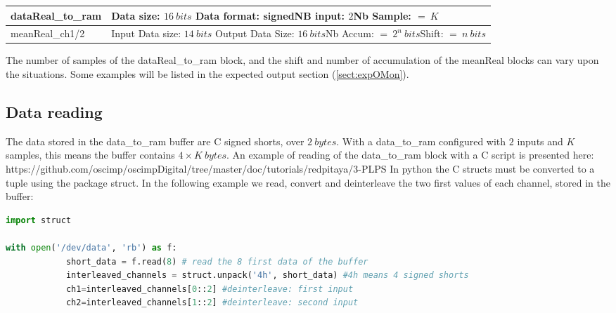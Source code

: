 \documentclass[12pt,oneside]{article}
\begin{document}
\begin{center}
	\begin{tabular}{|>{\centering\arraybackslash}m{.3\linewidth} | >{\centering\arraybackslash}m{.3\linewidth} |}
		\hline
		dataReal\_to\_ram&Data size: $16~bits$ \newline Data format: signed\newline NB input: $2$\newline Nb Sample: $=~K$\\
		\hline
		meanReal\_ch1/2&Input Data size: $14~bits$ \newline Output Data Size: $16~bits$\newline Nb Accum: $=~2^n~bits$\newline Shift: $=~n~bits$\\
		\hline
	\end{tabular}
\end{center}
\vspace{0.2cm}

The number of samples of the dataReal\_to\_ram block, and the shift and number of accumulation of the meanReal blocks can vary upon the situations. Some examples will be listed in the expected output section (\ref*{sect:expOMon}). 

\subsection{Data reading}

The data stored in the data\_to\_ram buffer are C signed shorts, over $2~bytes$. With a data\_to\_ram configured with $2$ inputs and $K$ samples, this means the buffer contains ${4\times K~bytes}$. An example of reading of the data\_to\_ram block with a C script is presented here:
\newline
https://github.com/oscimp/oscimpDigital/tree/master/doc/tutorials/redpitaya/3-PLPS
\newline\newline
In python the C structs must be converted to a tuple using the package struct. In the following example we read, convert and deinterleave the two first values of each channel, stored in the buffer:

\begin{lstlisting}[language=Python]
import struct

with open('/dev/data', 'rb') as f:
			short_data = f.read(8) # read the 8 first data of the buffer
			interleaved_channels = struct.unpack('4h', short_data) #4h means 4 signed shorts
			ch1=interleaved_channels[0::2] #deinterleave: first input
			ch2=interleaved_channels[1::2] #deinterleave: second input
\end{lstlisting}
\vspace{0.6cm}
\end{document}
